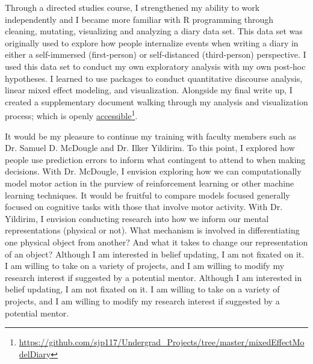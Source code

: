 \documentclass[12pt]{article}
\begin{document}
	Through a directed studies course, I strengthened my ability to work independently and I became more familiar with R programming through cleaning, mutating, visualizing and analyzing a diary data set. This data set was originally used to explore how people internalize events when writing a diary in either a self-immersed (first-person) or self-distanced (third-person) perspective. I used this data set to conduct my own exploratory analysis with my own post-hoc hypotheses. I learned to use packages to conduct quantitative discourse analysis, linear mixed effect modeling, and visualization. Alongside my final write up, I created a supplementary document walking through my analysis and visualization process; which is openly  \href{https://github.com/sjp117/Undergrad_Projects/tree/master/mixedEffectModelDiary}{accessible}\footnote{\url{https://github.com/sjp117/Undergrad\_Projects/tree/master/mixedEffectModelDiary}}.
	
	It would be my pleasure to continue my training with faculty members such as Dr. Samuel D. McDougle and Dr. Ilker Yildirim. To this point, I explored how people use prediction errors to inform what contingent to attend to when making decisions. With Dr. McDougle, I envision exploring how we can computationally model motor action in the purview of reinforcement learning or other machine learning techniques. It would be fruitful to compare models focused generally focused on cognitive tasks with those that involve motor activity. With Dr. Yildirim, I envision conducting research into how we inform our mental representations (physical or not). What mechanism is involved in differentiating one physical object from another? And what it takes to change our representation of an object? Although I am interested in belief updating, I am not fixated on it. I am willing to take on a variety of projects, and I am willing to modify my research interest if suggested by a potential mentor. Although I am interested in belief updating, I am not fixated on it. I am willing to take on a variety of projects, and I am willing to modify my research interest if suggested by a potential mentor.
	
\end{document}
